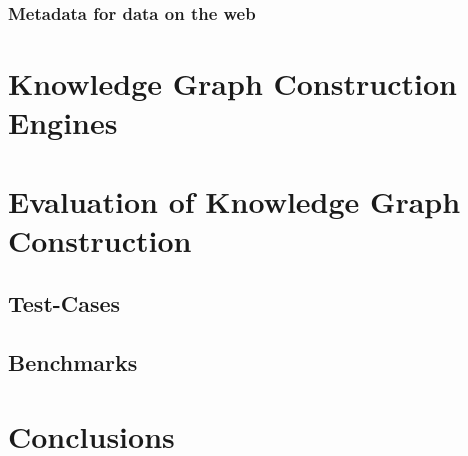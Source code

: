 \subsubsection{Metadata for data on the web}


\section{Knowledge Graph Construction Engines}

\section{Evaluation of Knowledge Graph Construction}

\subsection{Test-Cases}
\subsection{Benchmarks}



\section{Conclusions}
